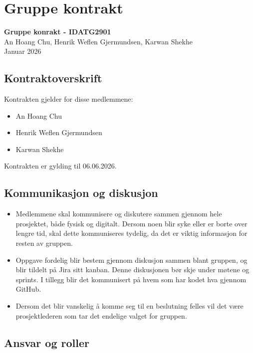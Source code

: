 \section{Gruppe kontrakt}

\begin{center}
    \Large\textbf{Gruppe konrakt - IDATG2901}\\[0.5em]
    An Hoang Chu, Henrik Weflen Gjermundsen, Karwan Shekhe\\[0.5em]
    Januar 2026
\end{center}

\subsection{Kontraktoverskrift}

Kontrakten gjelder for disse medlemmene:

\begin{itemize}
    \item An Hoang Chu
    \item Henrik Weflen Gjermundsen
    \item Karwan Shekhe
\end{itemize}

Kontrakten er gylding til 06.06.2026.

\subsection{Kommunikasjon og diskusjon}

\begin{itemize}
    \item Medlemmene skal kommunisere og diskutere sammen gjennom hele prosjektet, både fysisk og digitalt. Dersom noen blir syke eller er borte over lengre tid, skal dette kommuniseres tydelig, da det er viktig informasjon for resten av gruppen.
    \item Oppgave fordelig blir bestem gjennom diskusjon sammen blant gruppen, og blir tildelt på Jira sitt kanban. Denne diskusjonen bør skje under møtene og sprints. I tillegg blir det kommunisert på hvem som har kodet hva gjennom GitHub.
    \item Dersom det blir vanskelig å komme seg til en beslutning felles vil det være prosjektlederen som tar det endelige valget for gruppen.
\end{itemize}

\subsection{Ansvar og roller}


